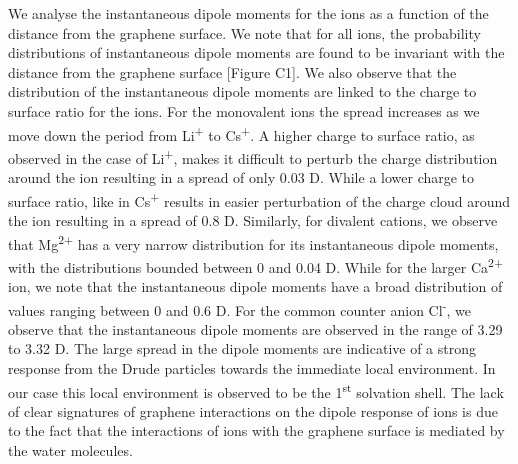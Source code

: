 We analyse the instantaneous dipole moments for the ions as a function of the distance from the graphene surface. We note that for all ions, the probability distributions of instantaneous dipole moments are found to be invariant with the distance from the graphene surface [Figure C1]. We also observe that the distribution of the instantaneous dipole moments are linked to the charge to surface ratio for the ions. For the monovalent ions the spread increases as we move down the period from Li\textsuperscript{+} to Cs\textsuperscript{+}. A higher charge to surface ratio, as observed in the case of Li\textsuperscript{+}, makes it difficult to perturb the charge distribution around the ion resulting in a spread of only 0.03 D. While a lower charge to surface ratio, like in Cs\textsuperscript{+} results in easier perturbation of the charge cloud around the ion resulting in a spread of 0.8 D. Similarly, for divalent cations, we observe that Mg\textsuperscript{2+} has a very narrow distribution for its instantaneous dipole moments, with the distributions bounded between 0 and 0.04 D. While for the larger Ca\textsuperscript{2+} ion, we note that the instantaneous dipole moments have a broad distribution of values ranging between 0 and 0.6 D. For the common counter anion Cl\textsuperscript{-}, we observe that the instantaneous dipole moments are observed in the range of 3.29 to 3.32 D. The large spread in the dipole moments are indicative of a strong response from the Drude particles towards the immediate local environment. In our case this local environment is observed to be the 1\textsuperscript{st} solvation shell. The lack of clear signatures of graphene interactions on the dipole response of ions is due to the fact that the interactions of ions with the graphene surface is mediated by the water molecules.
